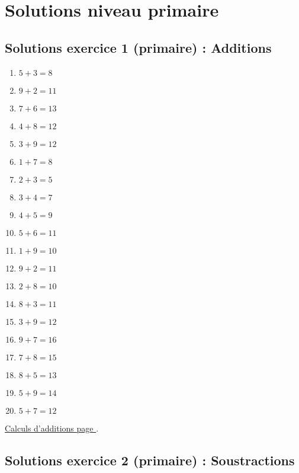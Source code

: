 \section{Solutions niveau primaire}

\newpage 

\subsection{Solutions exercice 1 (primaire) : Additions}

\label{sol:niveau1}

\begin{enumerate}[label=S\arabic*)]
	\item \(5 + 3 = 8 \)
	\item \(9 + 2 = 11 \)
	\item \(7 + 6 = 13 \)
	\item \(4 + 8 = 12 \)
	\item \(3 + 9 = 12 \)
	\item \(1 + 7 = 8 \)
	\item \(2 + 3 = 5 \)
	\item \(3 + 4 = 7 \)
	\item \(4 + 5 = 9 \)
	\item \(5 + 6 = 11 \)
	\item \(1 + 9 = 10 \)
	\item \(9 + 2 = 11 \)
	\item \(2 + 8 = 10 \)
	\item \(8 + 3 = 11 \)
	\item \(3 + 9 = 12 \)
	\item \(9 + 7 = 16 \)
	\item \(7 + 8 = 15 \)
	\item \(8 + 5 = 13 \)
	\item \(5 + 9 = 14 \)
	\item \(5 + 7 = 12\)
\end{enumerate}

\hyperref[calc:niveau1]{Calculs d'additions page \pageref{calc:niveau1}}.

\newpage 


\subsection{Solutions exercice 2 (primaire) : Soustractions}

\label{sol:niveau2}

